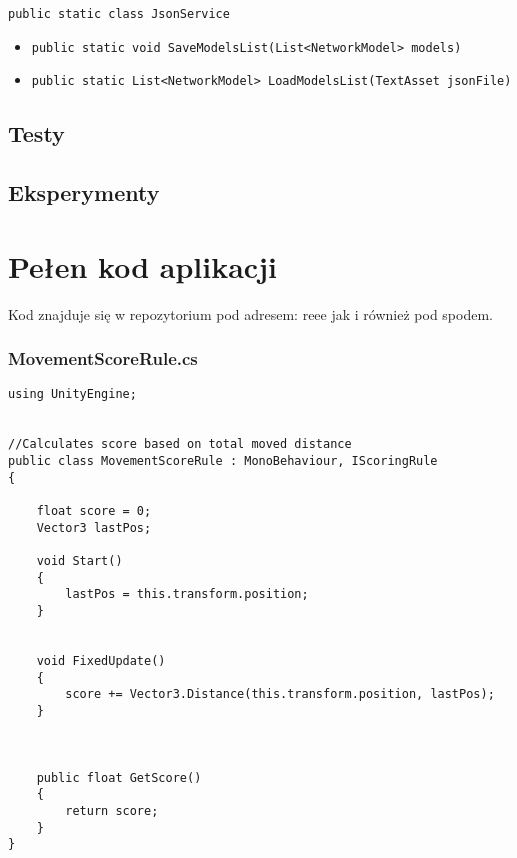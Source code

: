 \documentclass[12pt,a4paper]{article}
\begin{document}
\lstinline{public static class JsonService}
\begin{itemize}
    \item \lstinline|public static void SaveModelsList(List<NetworkModel> models)|
    \item \lstinline|public static List<NetworkModel> LoadModelsList(TextAsset jsonFile)|
\end{itemize}

\subsection*{Testy}

\subsection*{Eksperymenty}


\newpage
\section*{Pełen kod aplikacji}
Kod znajduje się w repozytorium pod adresem: reee
jak i również pod spodem.



\subsubsection*{MovementScoreRule.cs}
\begin{lstlisting}
using UnityEngine;


//Calculates score based on total moved distance
public class MovementScoreRule : MonoBehaviour, IScoringRule
{

    float score = 0;
    Vector3 lastPos;

    void Start()
    {
        lastPos = this.transform.position;
    }


    void FixedUpdate()
    {
        score += Vector3.Distance(this.transform.position, lastPos);
    }



    public float GetScore()
    {
        return score;
    }
}\end{lstlisting}
\pagebreak
\end{document}
